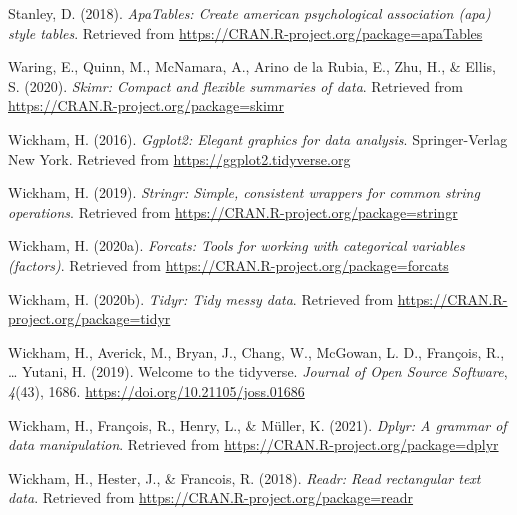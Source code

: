 \documentclass[
  english,
  man, noextraspace]{apa6}
\begin{document}
\leavevmode\hypertarget{ref-R-apaTables}{}%
Stanley, D. (2018). \emph{ApaTables: Create american psychological association (apa) style tables}. Retrieved from \url{https://CRAN.R-project.org/package=apaTables}

\leavevmode\hypertarget{ref-R-skimr}{}%
Waring, E., Quinn, M., McNamara, A., Arino de la Rubia, E., Zhu, H., \& Ellis, S. (2020). \emph{Skimr: Compact and flexible summaries of data}. Retrieved from \url{https://CRAN.R-project.org/package=skimr}

\leavevmode\hypertarget{ref-R-ggplot2}{}%
Wickham, H. (2016). \emph{Ggplot2: Elegant graphics for data analysis}. Springer-Verlag New York. Retrieved from \url{https://ggplot2.tidyverse.org}

\leavevmode\hypertarget{ref-R-stringr}{}%
Wickham, H. (2019). \emph{Stringr: Simple, consistent wrappers for common string operations}. Retrieved from \url{https://CRAN.R-project.org/package=stringr}

\leavevmode\hypertarget{ref-R-forcats}{}%
Wickham, H. (2020a). \emph{Forcats: Tools for working with categorical variables (factors)}. Retrieved from \url{https://CRAN.R-project.org/package=forcats}

\leavevmode\hypertarget{ref-R-tidyr}{}%
Wickham, H. (2020b). \emph{Tidyr: Tidy messy data}. Retrieved from \url{https://CRAN.R-project.org/package=tidyr}

\leavevmode\hypertarget{ref-R-tidyverse}{}%
Wickham, H., Averick, M., Bryan, J., Chang, W., McGowan, L. D., François, R., \ldots{} Yutani, H. (2019). Welcome to the tidyverse. \emph{Journal of Open Source Software}, \emph{4}(43), 1686. \url{https://doi.org/10.21105/joss.01686}

\leavevmode\hypertarget{ref-R-dplyr}{}%
Wickham, H., François, R., Henry, L., \& Müller, K. (2021). \emph{Dplyr: A grammar of data manipulation}. Retrieved from \url{https://CRAN.R-project.org/package=dplyr}

\leavevmode\hypertarget{ref-R-readr}{}%
Wickham, H., Hester, J., \& Francois, R. (2018). \emph{Readr: Read rectangular text data}. Retrieved from \url{https://CRAN.R-project.org/package=readr}

\endgroup
\end{document}
